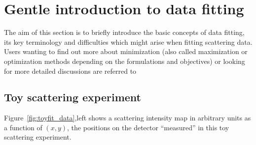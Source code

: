 %
\section{Gentle introduction to data fitting} 

The aim of this section is to briefly introduce the basic concepts of
data fitting, its key terminology and difficulties which might arise
when fitting scattering data.
Users wanting to find out more about minimization (also called
maximization or optimization methods depending on the formulations and objectives) 
or looking for more detailed discussions are referred to \cite{AnLu07, mntutorial}

\subsection{Toy scattering experiment}

Figure~\ref{fig:toyfit_data},left shows a scattering intensity map in arbitrary units  
as a function of $(x,y)$, the positions on the detector ``measured'' in this toy scattering experiment.

